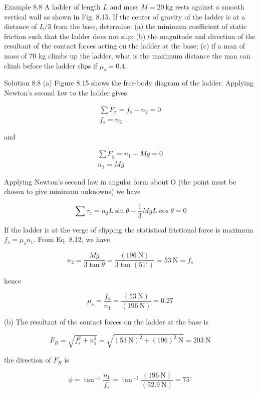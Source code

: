 \documentclass[10pt]{article}
\begin{document}
Example 8.8 A ladder of length $L$ and mass $M=20 \mathrm{~kg}$ rests against a smooth vertical wall as shown in Fig. 8.15. If the center of gravity of the ladder is at a distance of $L / 3$ from the base, determine: (a) the minimum coefficient of static friction such that the ladder does not slip; (b) the magnitude and direction of the resultant of the contact forces acting on the ladder at the base; (c) if a man of mass of 70 kg climbs up the ladder, what is the maximum distance the man can climb before the ladder slips if $\mu_{s}=0.4$.

Solution 8.8 (a) Figure 8.15 shows the free-body diagram of the ladder. Applying Newton's second law to the ladder gives

$$
\begin{gathered}
\sum F_{x}=f_{s}-n_{2}=0 \\
f_{s}=n_{2}
\end{gathered}
$$

and

$$
\begin{gathered}
\sum F_{y}=n_{1}-M g=0 \\
n_{1}=M g
\end{gathered}
$$

Applying Newton's second law in angular form about O (the point must be chosen to give minimum unknowns) we have


\begin{equation*}
\sum \tau_{z}=n_{2} L \sin \theta-\frac{1}{3} M g L \cos \theta=0 \tag{8.12}
\end{equation*}


If the ladder is at the verge of slipping the statistical frictional force is maximum $f_{s}=\mu_{s} n_{1}$. From Eq. 8.12, we have

$$
n_{2}=\frac{M g}{3 \tan \theta}=\frac{(196 \mathrm{~N})}{3 \tan \left(51^{\circ}\right)}=53 \mathrm{~N}=f_{s}
$$

hence

$$
\mu_{s}=\frac{f_{s}}{n_{1}}=\frac{(53 \mathrm{~N})}{(196 \mathrm{~N})}=0.27
$$

(b) The resultant of the contact forces on the ladder at the base is

$$
F_{R}=\sqrt{f_{s}^{2}+n_{1}^{2}}=\sqrt{(53 \mathrm{~N})^{2}+(196)^{2} \mathrm{~N}}=203 \mathrm{~N}
$$

the direction of $F_{R}$ is

$$
\phi=\tan ^{-1} \frac{n_{1}}{f_{s}}=\tan ^{-1} \frac{(196 \mathrm{~N})}{(52.9 \mathrm{~N})}=75^{\circ}
$$
\end{document}
